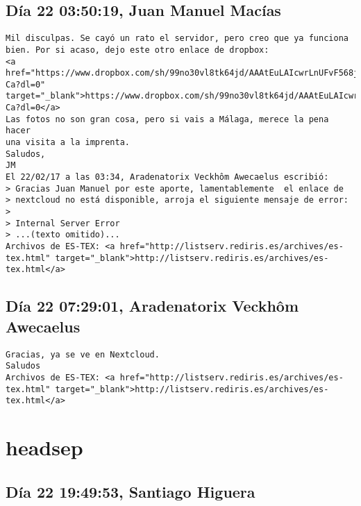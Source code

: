 \documentclass[a4paper,10pt]{article}
\begin{document}
\subsection{Día 22 03:50:19, Juan Manuel Macías}

\begin{lstlisting}
Mil disculpas. Se cayó un rato el servidor, pero creo que ya funciona 
bien. Por si acaso, dejo este otro enlace de dropbox: 
<a href="https://www.dropbox.com/sh/99no30vl8tk64jd/AAAtEuLAIcwrLnUFvF568j-Ca?dl=0" target="_blank">https://www.dropbox.com/sh/99no30vl8tk64jd/AAAtEuLAIcwrLnUFvF568j-Ca?dl=0</a>
Las fotos no son gran cosa, pero si vais a Málaga, merece la pena hacer 
una visita a la imprenta.
Saludos,
JM
El 22/02/17 a las 03:34, Aradenatorix Veckhôm Awecaelus escribió:
> Gracias Juan Manuel por este aporte, lamentablemente  el enlace de
> nextcloud no está disponible, arroja el siguiente mensaje de error:
>
> Internal Server Error
> ...(texto omitido)...
Archivos de ES-TEX: <a href="http://listserv.rediris.es/archives/es-tex.html" target="_blank">http://listserv.rediris.es/archives/es-tex.html</a>

\end{lstlisting}

\subsection{Día 22 07:29:01, Aradenatorix Veckhôm Awecaelus}

\begin{lstlisting}
Gracias, ya se ve en Nextcloud.
Saludos
Archivos de ES-TEX: <a href="http://listserv.rediris.es/archives/es-tex.html" target="_blank">http://listserv.rediris.es/archives/es-tex.html</a>

\end{lstlisting}
\section{headsep}

\subsection{Día 22 19:49:53, Santiago Higuera}
\end{document}
